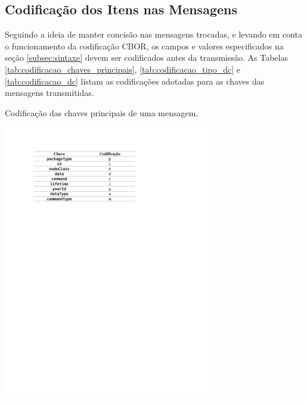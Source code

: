 \subsection{Codificação dos Itens nas Mensagens}
Seguindo a ideia de manter concisão nas mensagens trocadas, e levando em conta o funcionamento da codificação CBOR, os campos e valores especificados na seção \ref{subsec:sintaxe} devem ser codificados antes da transmissão. As Tabelas \ref{tab:codificacao_chaves_principais}, \ref{tab:codificacao_tipo_dc} e \ref{tab:codificacao_dc} listam as codificações adotadas para as chaves das mensagens transmitidas.

\begin{table}[hp]
	\centering
	\caption{Codificação das chaves principais de uma mensagem.}\smallskip
	\label{tab:codificacao_chaves_principais}
	\includegraphics[width=0.7\textwidth]{tabelas/codificacao_chaves_principais.pdf}
	

\end{table}
